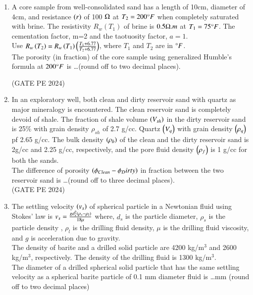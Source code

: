 \documentclass[journal,12pt,onecolumn]{IEEEtran}
\theoremstyle{remark}
\begin{document}
\begin{enumerate}
\item A core sample from well-consolidated sand has a length of 10cm, diameter of 4cm, and resistance $\left(r\right)$ of 100 $\ohm$ at $T_2=200\degree F$ when completely saturated with brine. The resistivity $R_w(T_1)$ of brine is $0.5\ohm.m$ at $T_1=75\degree F$. The cementation factor, m=2 and the taotuosity factor, $a=1$.\\
Use $R_w\left(T_2\right)=R_w\left(T_1\right)\left(\frac{T_1+6.77}{T_2+6.77}\right)$, where $T_1$ and $T_2$ are in $\degree F$.\\
The porosity (in fraction) of the core sample using generalized Humble's formula at $200\degree F$ is \dots (round off to two decimal places).

\hfill{(GATE PE 2024)}

\item In an exploratory well, both clean and dirty reservoir sand with quartz as major mineralogy is encountered. The clean reservoir sand is completely devoid of shale. The fraction of shale volume $\left(V_{sh}\right)$ in the dirty reservoir sand is 25\% with grain density $\rho_{sh}$ of 2.7 g/cc. Quartz $\left(V_q\right)$ with grain density $\left(\rho_q\right)$ pf 2.65 g/cc. The bulk density $\left(\rho_b\right)$ of the clean and the dirty reservoir sand is 2g/cc and 2.25 g/cc, respectively, and the pore fluid density $\left(\rho_f\right)$ is 1 g/cc for both the sands.\\
The difference of porosity $\left(\phi_{Clean}-\phi_Dirty\right)$ in fraction between the two reservoir sand is \dots (round off to three decimal places).\\

\hfill{(GATE PE 2024)}

\item The settling velocity $\left(v_s\right)$ of spherical particle in a Newtonian fluid using Stokes' law is $v_s=\frac{gd^2_s\left(\rho_s-\rho_l\right)}{18 \mu}$ where, $d_s$ is the particle diameter, $\rho_s$ is the particle density , $\rho_l$ is the drilling fluid density, $\mu$ is the drilling fluid viscosity, and $g$ is acceleration due to gravity.\\
The density of barite and a drilled solid particle are 4200 kg/m$^3$ and 2600 kg/m$^3$, respectively. The density of the drilling fluid is 1300 kg/m$^3$.\\
The diameter of a drilled spherical solid particle that has the same settling velocity as a spherical barite particle of 0.1 mm diameter fluid is \dots mm (round off to two decimal places)\\


\end{enumerate}
\end{document}
